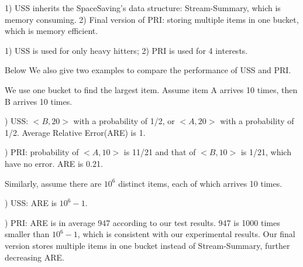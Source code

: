 { 1) USS inherits the SpaceSaving's data structure: Stream-Summary, which is memory consuming. 2) Final version of PRI: storing multiple items in one bucket, which is memory efficient. 


 1) USS is used for only heavy hitters;
2) PRI is used for 4 interests.


Below We also give two examples to compare the performance of USS and PRI. 

 We use one bucket to find the largest item. Assume item A arrives 10 times, then B arrives 10 times. 
\par
{}) USS: $<B,20>$ with a probability of 1/2, or $<A,20>$ with a probability of 1/2. Average Relative Error(ARE) is 1. \par
{}) PRI: probability of $<A,10>$ is 11/21 and that of $<B,10>$ is 1/21, which have no error. ARE is 0.21. 


 Similarly, assume there are $10^6$ distinct items, each of which arrives 10 times. \par
{}) USS: ARE is $10^6-1$. \par
{}) PRI: ARE is in average 947 according to our test results. 947 is 1000 times smaller than $10^6-1$, which is consistent with our experimental results.
Our final version stores multiple items in one bucket instead of Stream-Summary, further decreasing ARE.
}

%
%


%

